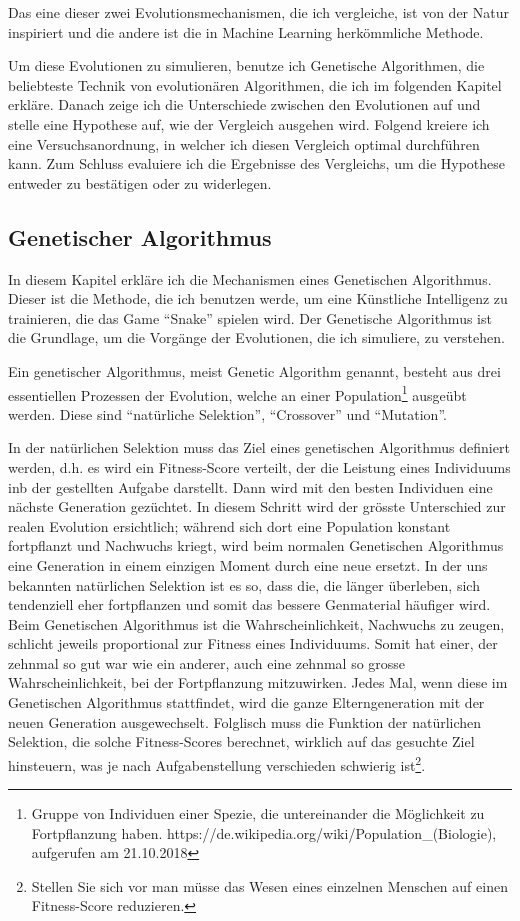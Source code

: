 \documentclass[11pt,a4paper,ngerman]{article}
\begin{document}
\bigskip
Das eine dieser zwei Evolutionsmechanismen, die ich vergleiche, ist von der Natur inspiriert und die andere ist die in Machine Learning herkömmliche Methode.

\bigskip
Um diese Evolutionen zu simulieren, benutze ich Genetische Algorithmen, die beliebteste Technik von evolutionären Algorithmen, die ich im folgenden Kapitel erkläre. Danach zeige ich die Unterschiede zwischen den Evolutionen auf und stelle eine Hypothese auf, wie der Vergleich ausgehen wird. Folgend kreiere ich eine Versuchsanordnung, in welcher ich diesen Vergleich optimal durchführen kann. Zum Schluss evaluiere ich die Ergebnisse des Vergleichs, um die Hypothese entweder zu bestätigen oder zu widerlegen. 

\subsection{Genetischer Algorithmus}

In diesem Kapitel erkläre ich die Mechanismen eines Genetischen Algorithmus. Dieser ist die Methode, die ich benutzen werde, um eine Künstliche Intelligenz zu trainieren, die das Game \enquote{Snake} spielen wird. Der Genetische Algorithmus ist die Grundlage, um die Vorgänge der Evolutionen, die ich simuliere, zu verstehen.

\bigskip
Ein genetischer Algorithmus, meist Genetic Algorithm genannt, besteht aus drei essentiellen Prozessen der Evolution, welche an einer Population\footnote{Gruppe von Individuen einer Spezie, die untereinander die Möglichkeit zu Fortpflanzung haben. https://de.wikipedia.org/wiki/Population\_(Biologie), aufgerufen am 21.10.2018} ausgeübt werden. Diese sind \enquote{natürliche Selektion}, \enquote{Crossover} und \enquote{Mutation}.

\bigskip
In der natürlichen Selektion muss das Ziel eines genetischen Algorithmus definiert werden, d.h. es wird ein Fitness-Score verteilt, der die Leistung eines Individuums inb der gestellten Aufgabe darstellt. Dann wird mit den besten Individuen eine nächste Generation gezüchtet. In diesem Schritt wird der grösste Unterschied zur realen Evolution ersichtlich; während sich dort eine Population konstant fortpflanzt und Nachwuchs kriegt, wird beim normalen Genetischen Algorithmus eine Generation in einem einzigen Moment durch eine neue ersetzt. In der uns bekannten natürlichen Selektion ist es so, dass die, die länger überleben, sich tendenziell eher fortpflanzen und somit das bessere Genmaterial häufiger wird. Beim Genetischen Algorithmus ist die Wahrscheinlichkeit, Nachwuchs zu zeugen, schlicht jeweils proportional zur Fitness eines Individuums. Somit hat einer, der zehnmal so gut war wie ein anderer, auch eine zehnmal so grosse Wahrscheinlichkeit, bei der Fortpflanzung mitzuwirken. Jedes Mal, wenn diese im Genetischen Algorithmus stattfindet, wird die ganze Elterngeneration mit der neuen Generation ausgewechselt. Folglisch muss die Funktion der natürlichen Selektion, die solche Fitness-Scores berechnet, wirklich auf das gesuchte Ziel hinsteuern, was je nach Aufgabenstellung verschieden schwierig ist\footnote{Stellen Sie sich vor man müsse das Wesen eines einzelnen Menschen auf einen Fitness-Score reduzieren.}.
\end{document}
